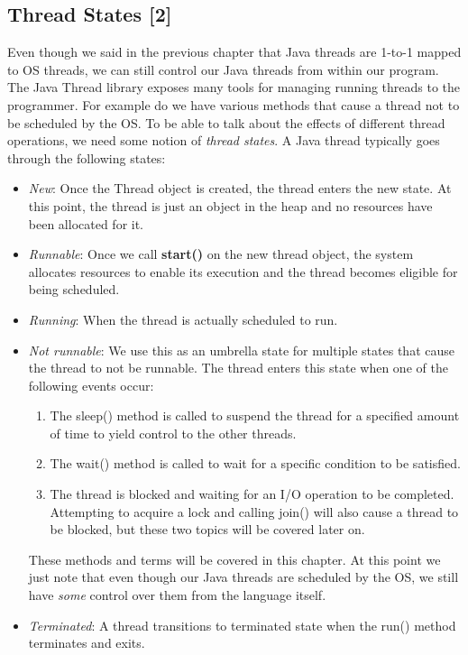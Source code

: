 \documentclass[main.tex]{subfiles}
\begin{document}
\subsection{Thread States [2]}
Even though we said in the previous chapter that Java threads are 1-to-1 mapped to OS threads, we can still control our Java threads from within our program. The Java Thread library exposes many tools for managing running threads to the programmer. For example do we have various methods that cause a thread not to be scheduled by the OS. To be able to talk about the effects of different thread operations, we need some notion of \textit{thread states}. A Java thread typically goes through the following states:
\begin{itemize}
    \item \textit{New}: Once the Thread object is created, the thread enters the new state. At this point, the thread is just an object in the heap and no resources have been allocated for it.
    \item \textit{Runnable}: Once we call \textbf{start()} on the new thread object, the system allocates resources to enable its execution and the thread becomes eligible for being scheduled.
    \item \textit{Running}: When the thread is actually scheduled to run.
    \item \textit{Not runnable}: We use this as an umbrella state for multiple states that cause the thread to not be runnable. The thread enters this state when one of the following events occur:
        \begin{enumerate}
            \item The sleep() method is called to suspend the thread for a specified amount of time to yield control to the other threads.
            \item The wait() method is called to wait for a specific condition to be satisfied.
            \item The thread is blocked and waiting for an I/O operation to be completed. Attempting to acquire a lock and calling join() will also cause a thread to be blocked, but these two topics will be covered later on.
        \end{enumerate}
    These methods and terms will be covered in this chapter. At this point we just note that even though our Java threads are scheduled by the OS, we still have \textit{some} control over them from the language itself.
    \item \textit{Terminated}: A thread transitions to terminated state when the run() method terminates and exits.
\end{itemize}
\end{document}
